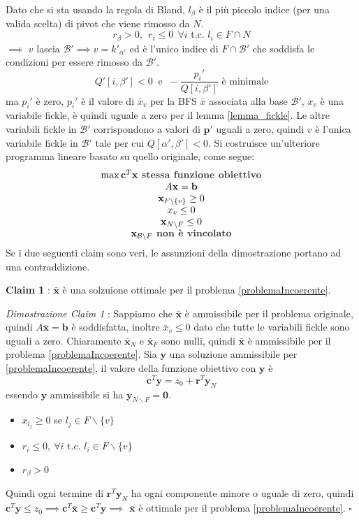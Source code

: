 \documentclass[10pt, letterpaper]{report}
\begin{document}
Dato che si sta usando la regola di Bland, $l_\beta$ è il più piccolo indice (per una valida scelta) di pivot che viene rimosso da $N$.
$$ 
r_\beta>0, \ \  r_i\le 0 \ \ \forall i \text{ t.c. }l_i\in F\cap N 
$$
$\implies $ $v$ lascia $\mathcal{B}
'\implies v = k'_{\alpha '}$ 
ed è l'unico indice di $F\cap 
\mathcal{B}'$ che soddisfa le condizioni per essere rimosso da $\mathcal B'$. 
$$
Q'[i,\beta']<0 \ \text{ e } \ -\frac{p_i'}{Q[i,\beta']}\text{ è minimale}
$$
ma $p_i'$ è zero, $p_i'$ è il valore di $\bar{x}_v$ per la BFS $\bar x$ associata alla base $\mathcal B'$, $x_v$ è una variabile fickle, è quindi uguale a zero per il lemma \ref{lemma_fickle}. Le altre variabili fickle in $\mathcal B'$ corrispondono a valori di $\mathbf p'$ uguali a zero, quindi $v$ è l'unica variabile fickle in $\mathcal B'$ tale per cui $Q[\alpha',\beta' ]<0$. Si costruisce un'ulteriore programma lineare basato su quello originale, come segue:
\begin{equation}\label{problemaIncoerente}
    \begin{matrix}
        \max \mathbf c^T\mathbf x \textg{ stessa funzione obiettivo}\\ 
        A\mathbf x  =\mathbf b\\ 
        \mathbf x_{F\backslash \{v\}}\ge 0 \\ 
        x_v\le 0 \\
        \mathbf x_{N\backslash F}\le 0\\ 
        \mathbf x_{\mathcal B\backslash F}\textg{ non è vincolato}
    \end{matrix}
\end{equation}
Se i due seguenti claim sono veri, le assunzioni della dimostrazione portano ad una contraddizione.\bigskip 

\textbf{Claim 1} : $\bar{\mathbf x}$
 è una solzuione ottimale per il problema 
 \ref{problemaIncoerente}.\bigskip 

\textit{Dimostrazione Claim 1} : Sappiamo che $\bar{\mathbf x}$ è ammissibile per il problema originale, quindi $A\bar{\mathbf x}=\mathbf b$ è soddisfatta, inoltre $\bar x_v\le 0$ dato che tutte le variabili fickle sono uguali a zero. Chiaramente $\bar{\mathbf x}_N$ e $\bar{\mathbf x}_F$ sono nulli, quindi $\bar{\mathbf x}$ è ammissibile per il problema  \ref{problemaIncoerente}. Sia $\mathbf y$ una soluzione ammissibile per  \ref{problemaIncoerente}, il valore della funzione obiettivo con $\mathbf y$ è 
$$\mathbf c^T\mathbf y = z_0+\mathbf r^T\mathbf y_N $$
essendo $\mathbf y $ ammissibile si ha ${\mathbf y}_{N\backslash F}=\mathbf 0$.\begin{itemize}
    \item $x_{l_j}\ge 0$ se $l_j\in F\backslash\{v\}$
    \item $r_i\le 0, \ \forall i \text{ t.c. } l_i\in F\backslash\{v\}$
    \item $r_\beta > 0$
\end{itemize}
Quindi ogni termine di $\mathbf r^T\mathbf y_N$ ha ogni componente minore o uguale di zero, quindi $\mathbf c^T\mathbf y \le z_0\implies \mathbf c^T\bar{\mathbf x}\ge 
\mathbf c^T\mathbf y\implies$ $\bar{\mathbf x}$ è ottimale per il problema \ref{problemaIncoerente}. \hfill $\square$
\end{document}
